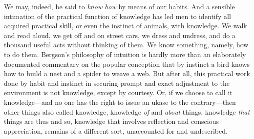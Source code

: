 \documentclass[12pt]{article}
\begin{document}
We may, indeed, be said to \emph{know how} by means of our
habits. And a sensible intimation of the practical function
of knowledge has led men to identify all acquired
practical skill, or even the instinct of animals, with
knowledge. We walk and read aloud, we get off and
on street cars, we dress and undress, and do a thousand
useful acts without thinking of them. We know something,
namely, how to do them. Bergson's philosophy
of intuition is hardly more than an elaborately documented
commentary on the popular conception that by
instinct a bird knows how to build a nest and a spider
to weave a web. But after all, this practical work
done by habit and instinct in securing prompt and exact
adjustment to the environment is not knowledge, except
by courtesy. Or, if we choose to call it knowledge---and
no one has the right to issue an ukase to the contrary---then
other things also called knowledge, knowledge
\emph{of} and \emph{about} things, knowledge \emph{that} things are
thus and so, knowledge that involves reflection and conscious
appreciation, remains of a different sort, unaccounted
for and undescribed.
\end{document}
